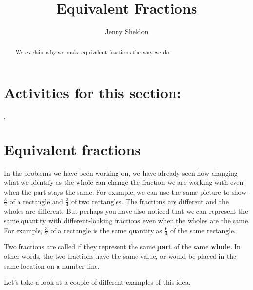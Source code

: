 \documentclass{ximera}
\title{Equivalent Fractions}
\author{Jenny Sheldon}
\begin{document}
\begin{abstract}
We explain why we make equivalent fractions the way we do.
\end{abstract}
\maketitle

\section{Activities for this section:}  
, 


\section{Equivalent fractions}

In the problems we have been working on, we have already seen how changing what we identify as the whole can change the fraction we are working with even when the part stays the same. For example, we can use the same picture to show $\frac{3}{2}$ of a rectangle and $\frac{3}{4}$ of two rectangles. The fractions are different and the wholes are different. But perhaps you have also noticed that we can represent the same quantity with different-looking fractions even when the wholes are the same. For example, $\frac{3}{2}$ of a rectangle is the same quantity as $\frac{6}{4}$ of the same rectangle.

\begin{definition}
Two fractions are called  if they represent the same {\bf part} of the same {\bf whole}. In other words, the two fractions have the same value, or would be placed in the same location on a number line.
\end{definition}

Let's take a look at a couple of different examples of this idea.
\end{document}
